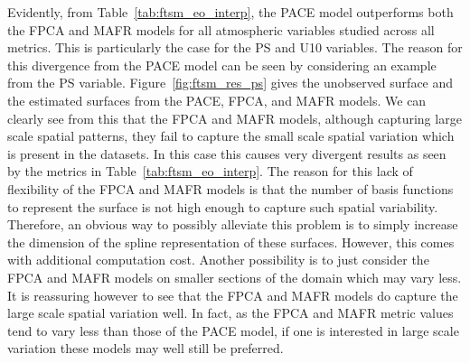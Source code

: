 Evidently, from Table~\ref{tab:ftsm_eo_interp}, the PACE model outperforms both the FPCA and MAFR models for all atmospheric variables studied across all metrics.
This is particularly the case for the PS and U10 variables. 
The reason for this divergence from the PACE model can be seen by considering an example from the PS variable.
Figure~\ref{fig:ftsm_res_ps} gives the unobserved surface and the estimated surfaces from the PACE, FPCA, and MAFR models.
We can clearly see from this that the FPCA and MAFR models, although capturing large scale spatial patterns, they fail to capture the small scale spatial variation which is present in the datasets.
In this case this causes very divergent results as seen by the metrics in Table~\ref{tab:ftsm_eo_interp}. 
The reason for this lack of flexibility of the FPCA and MAFR models is that the number of basis functions to represent the surface is not high enough to capture such spatial variability. 
Therefore, an obvious way to possibly alleviate this problem is to simply increase the dimension of the spline representation of these surfaces. 
However, this comes with additional computation cost.
Another possibility is to just consider the FPCA and MAFR models on smaller sections of the domain which may vary less.
It is reassuring however to see that the FPCA and MAFR models do capture the large scale spatial variation well.
In fact, as the FPCA and MAFR metric values tend to vary less than those of the PACE model, if one is interested in large scale variation these models may well still be preferred.

